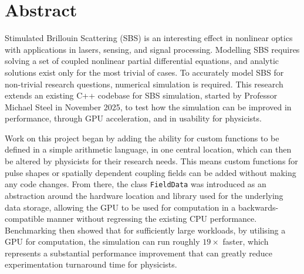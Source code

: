 \documentclass[12pt,a4paper,oneside]{report}
\begin{document}


\chapter*{Abstract}

Stimulated Brillouin Scattering (SBS) is an interesting effect in nonlinear optics with applications in lasers, sensing, and signal processing.
Modelling SBS requires solving a set of coupled nonlinear partial differential equations, and analytic solutions
exist only for the most trivial of cases. To accurately model SBS for non-trivial research questions, numerical simulation is required.
This research extends an existing C++ codebase for SBS simulation, started by Professor Michael Steel in November 2025,
to test how the simulation can be improved in performance, through GPU acceleration, and in usability for physicists.

Work on this project began by adding the ability for custom functions to be defined in a simple arithmetic language, in one central
location, which can then be altered by physicists for their research needs. This means custom functions for pulse shapes or spatially
dependent coupling fields can be added without making any code changes. From there, the class \texttt{FieldData} was introduced
as an abstraction around the hardware location and library used for the underlying data storage, allowing the GPU
to be used for computation in a backwards-compatible manner without regressing the existing CPU performance.
Benchmarking then showed that for sufficiently large workloads, by utilising a GPU for computation, the simulation can run
roughly $19\times$ faster, which represents a substantial performance improvement that can greatly reduce experimentation
turnaround time for physicists.

\tableofcontents

\clearpage
{}







\printbibliography[heading=bibintoc,title={Bibliography}]

\appendix

\end{document}
